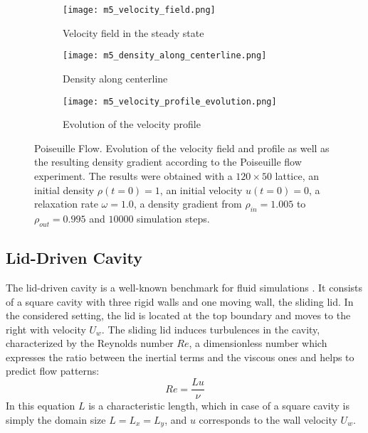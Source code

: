 \begin{figure}[ht!]
    \begin{subfigure}{0.53\linewidth}
        \centering
        \texttt{[image: m5\_velocity\_field.png]}
        \caption{Velocity field in the steady state}
        \label{fig:poiseuille:flow-field}
    \end{subfigure}%
    \begin{subfigure}{0.47\linewidth}
        \centering
        \texttt{[image: m5\_density\_along\_centerline.png]}
        \caption{Density along centerline}
        \label{fig:poiseuille:density-centerline}
    \end{subfigure}

    \begin{subfigure}{\linewidth}
        \centering
        \texttt{[image: m5\_velocity\_profile\_evolution.png]}
        \caption{Evolution of the velocity profile}
        \label{fig:poiseuille:profile}
    \end{subfigure}
    \caption[Poiseuille Flow]{Poiseuille Flow. Evolution of the velocity field and profile as well as the resulting density gradient according to the Poiseuille flow experiment. The results were obtained with a $120\times50$ lattice, an initial density $\rho(t=0)=1$, an initial velocity $u(t=0)=0$, a relaxation rate $\omega=1.0$, a density gradient from $\rho_{in}=1.005$ to $\rho_{out}=0.995$ and $10000$ simulation steps.}
    \label{fig:poiseuille}
\end{figure}

\subsection{Lid-Driven Cavity}

The lid-driven cavity is a well-known benchmark for fluid simulations \cite{mohamad2019}. It consists of a square cavity with three rigid walls and one moving wall, the sliding lid. In the considered setting, the lid is located at the top boundary and moves to the right with velocity $U_w$. The sliding lid induces turbulences in the cavity, characterized by the Reynolds number $Re$, a dimensionless number which expresses the ratio between the inertial terms and the viscous ones and helps to predict flow patterns:
\begin{equation}
    \label{eq:reynolds-number}
    Re = \frac{Lu}{\nu}
\end{equation}
In this equation $L$ is a characteristic length, which in case of a square cavity is simply the domain size $L=L_x=L_y$, and $u$ corresponds to the wall velocity $U_w$.

